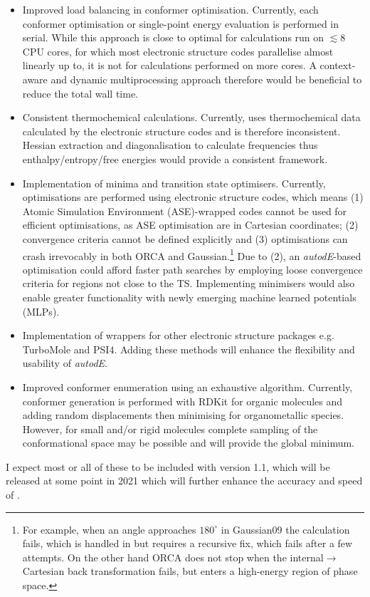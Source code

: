 \documentclass[../../main.tex]{subfiles}
\begin{document}
\begin{itemize}
	\item Improved load balancing in conformer optimisation. Currently, each conformer optimisation or single-point energy evaluation is performed in serial. While this approach is close to optimal for calculations run on $\lesssim 8$ CPU cores, for which most electronic structure codes parallelise almost linearly up to, it is not for \ade calculations performed on more cores. A context-aware and dynamic multiprocessing approach therefore would be beneficial to reduce the total wall time.
	
	\item Consistent thermochemical calculations. Currently, \ade uses thermochemical data calculated by the electronic structure codes and is therefore inconsistent. Hessian extraction and diagonalisation to calculate frequencies thus enthalpy/entropy/free energies would provide a consistent framework.
	
	\item Implementation of minima and transition state optimisers. Currently, optimisations are performed using electronic structure codes, which means (1) Atomic Simulation Environment (ASE\cite{ASE2017})-wrapped codes cannot be used for efficient optimisations, as ASE optimisation are in Cartesian coordinates; (2) convergence criteria cannot be defined explicitly and (3) optimisations can crash irrevocably in both ORCA and Gaussian.\footnote{For example, when an angle approaches ${180}^{\circ}$ in Gaussian09 the calculation fails, which is handled in \ade but requires a recursive fix, which fails after a few attempts. On the other hand ORCA does not stop when the internal$\rightarrow$Cartesian back transformation fails, but enters a high-energy region of phase space.} Due to (2), an \emph{autodE}-based optimisation could afford faster path searches by employing loose convergence criteria for regions not close to the TS. Implementing minimisers would also enable greater functionality with newly emerging machine learned potentials (MLPs).
	
	\item Implementation of wrappers for other electronic structure packages e.g. TurboMole and PSI4. Adding these methods will enhance the flexibility and usability of \emph{autodE}.
	
	\item Improved conformer enumeration using an exhaustive algorithm. Currently, conformer generation is performed with RDKit for organic molecules and adding random displacements then minimising for organometallic species. However, for small and/or rigid molecules complete sampling of the conformational space may be possible and will provide the global minimum.
	
\end{itemize}

I expect most or all of these to be included with version 1.1, which will be released at some point in 2021 which will further enhance the accuracy and speed of \ade.


\clearpage
\end{document}
